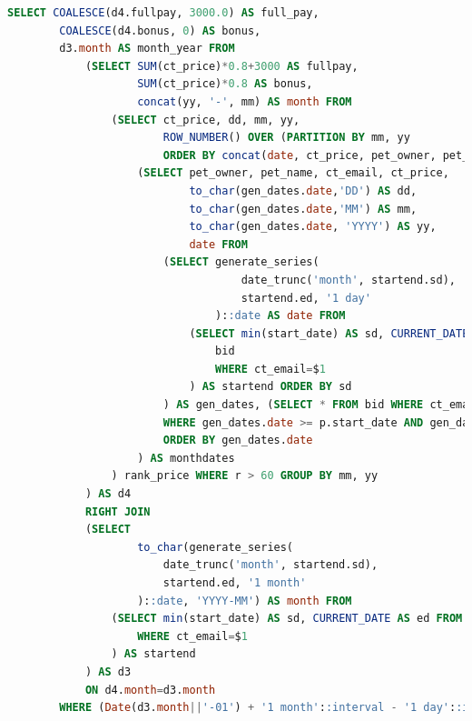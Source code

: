 \documentclass[
  paper=a4,
  ,captions=tableheading
]{scrartcl}
\begin{document}
\begin{lstlisting}[language=SQL]
SELECT COALESCE(d4.fullpay, 3000.0) AS full_pay,
        COALESCE(d4.bonus, 0) AS bonus,
        d3.month AS month_year FROM
            (SELECT SUM(ct_price)*0.8+3000 AS fullpay,
                    SUM(ct_price)*0.8 AS bonus,
                    concat(yy, '-', mm) AS month FROM
                (SELECT ct_price, dd, mm, yy,
                        ROW_NUMBER() OVER (PARTITION BY mm, yy
                        ORDER BY concat(date, ct_price, pet_owner, pet_name, ct_email) ASC) AS r FROM
                    (SELECT pet_owner, pet_name, ct_email, ct_price,
                            to_char(gen_dates.date,'DD') AS dd,
                            to_char(gen_dates.date,'MM') AS mm,
                            to_char(gen_dates.date, 'YYYY') AS yy,
                            date FROM
                        (SELECT generate_series(
                                    date_trunc('month', startend.sd),
                                    startend.ed, '1 day'
                                )::date AS date FROM
                            (SELECT min(start_date) AS sd, CURRENT_DATE as ed FROM
                                bid
                                WHERE ct_email=$1
                            ) AS startend ORDER BY sd
                        ) AS gen_dates, (SELECT * FROM bid WHERE ct_email=$1) AS p
                        WHERE gen_dates.date >= p.start_date AND gen_dates.date <= p.end_date
                        ORDER BY gen_dates.date
                    ) AS monthdates
                ) rank_price WHERE r > 60 GROUP BY mm, yy
            ) AS d4
            RIGHT JOIN
            (SELECT
                    to_char(generate_series(
                        date_trunc('month', startend.sd),
                        startend.ed, '1 month'
                    )::date, 'YYYY-MM') AS month FROM
                (SELECT min(start_date) AS sd, CURRENT_DATE AS ed FROM bid
                    WHERE ct_email=$1
                ) AS startend
            ) AS d3
            ON d4.month=d3.month
        WHERE (Date(d3.month||'-01') + '1 month'::interval - '1 day'::interval) <= CURRENT_DATE
\end{lstlisting}
\end{document}
